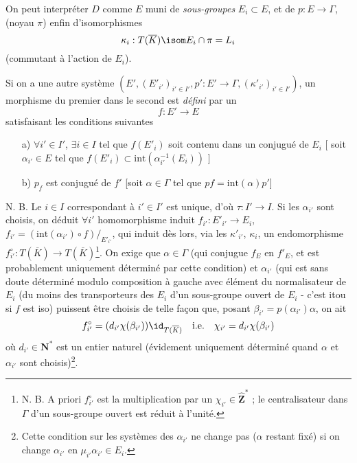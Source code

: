 On peut interpréter $D$ comme $E$ muni de \emph{sous-groupes} $E_i \subset  E$, et de $p:E \to \Gamma$, (noyau $\pi$) enfin d'isomorphismes
$$
\kappa_i: T(\overline{K}) \isom E_i \cap \pi = L_i
$$
(commutant à l'action de $E_i$).

Si on a une autre système $(E', (E'_{i'})_{i' \in I'}, p': E' \to \Gamma, (\kappa'_{i'})_{i' \in I'})$, un morphisme du premier dans le second est \emph{défini} par un 
$$
f: E' \to E
$$
satisfaisant les conditions suivantes
\begin{enumerate}
    \item[a)] $\forall i' \in I'$, $\exists i \in I$ tel que $f(E'_i)$ soit contenu dans un conjugué de $E_i$ [ soit $\alpha_{i'} \in E$ tel que $f(E'_i) \subset  \text{int}(\alpha^{-1}_{i'}(E_i))$ ]
    \item[b)] $p_f$ est conjugué de $f'$ [soit $\alpha \in \Gamma$ tel que $pf = \text{int}(\alpha)p'$]
\end{enumerate}

N. B. Le $i \in I$ correspondant à $i' \in I'$ est unique, d'où $\tau: I' \to I$. Si les $\alpha_{i'}$ sont choisis, on déduit $\forall i'$ homomorphisme induit $f_{i'}: E'_{i'} \to E_i$, $f_{i'} = (\text{int}(\alpha_{i'}) \circ f)/_{E'_{i'}}$, qui induit dès lors, via les $\kappa'_{i'}$, $\kappa_i$, un endomorphisme $f^\circ_{i'}: T(\overline{K}) \to T(\overline{K})$\footnote{N. B. A priori $f^\circ_{i'}$ est la multiplication par un $\chi_{i'} \in \widehat{\mathbf{Z}}^*$ ; le centralisateur dans $\Gamma$ d'un sous-groupe ouvert est réduit à l'unité.}. On exige que $\alpha \in \Gamma$ (qui conjugue $f_E$ en $f'_E$, et est probablement uniquement déterminé par cette condition) et $\alpha_{i'}$ (qui est sans doute déterminé modulo composition à gauche avec élément du normalisateur de $E_i$ (du moins des transporteurs des $E_i$ d'un sous-groupe ouvert de $E_i$ - c'est itou si $f$ est iso) puissent être choisis de telle fa\c{c}on que, posant $\beta_{i'} = p(\alpha_{i'})\alpha$, on ait
$$
f^\circ_{i'} = (d_{i'} \chi (\beta_{i'})) \id_{T(\overline{K})} \quad \text{i.e.} \quad \chi_{i'} = d_{i'} \chi(\beta_{i'})
$$
où $d_{i'} \in \mathbf{N}^*$ est un entier naturel (évidement uniquement déterminé quand $\alpha$ et $\alpha_{i'}$ sont choisis)\footnote{Cette condition sur les systèmes des $\alpha_{i'}$ ne change pas ($\alpha$ restant fixé) si on change $\alpha_{i'}$ en $\mu_{i'} \alpha_{i'} \in E_i$.}.










